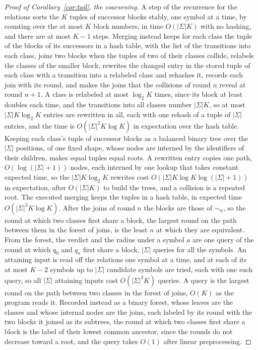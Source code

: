 \documentclass[11pt,a4paper]{article}
\theoremstyle{definition}
\theoremstyle{plain}
\begin{document}
\begin{proof}[Proof of Corollary~\ref{cor:tail}, the coarsening]
A step of the recurrence for the relations sorts the \(K\) tuples of successor blocks stably, one symbol at a time, by
counting over the at most \(K\) block numbers, in time \(O(|\Sigma| K)\) with no hashing, and there are at most
\(K - 1\) steps. Merging instead keeps for each class the tuple of the blocks of its successors in a hash table, with
the list of the transitions into each class, joins two blocks when the tuples of two of their classes collide, relabels
the classes of the smaller block, rewrites the changed entry in the stored tuple of each class with a transition into a
relabeled class and rehashes it, records each join with its round, and makes the joins that the collisions of round
\(n\) reveal at round \(n + 1\). A class is relabeled at most \(\log_2 K\) times, since its block at least doubles each
time, and the transitions into all classes number \(|\Sigma| K\), so at most \(|\Sigma| K \log_2 K\) entries are
rewritten in all, each with one rehash of a tuple of \(|\Sigma|\) entries, and the time is \(O(|\Sigma|^2 K \log K)\) in
expectation over the hash table. Keeping each class's tuple of successor blocks as a balanced binary tree over the
\(|\Sigma|\) positions, of one fixed shape, whose nodes are interned by the identifiers of their children, makes equal
tuples equal roots. A rewritten entry copies one path, \(O(\log(|\Sigma| + 1))\) nodes, each interned by one lookup that
takes constant expected time, so the \(|\Sigma| K \log_2 K\) rewrites cost \(O(|\Sigma| K \log K \log(|\Sigma| + 1))\)
in expectation, after \(O(|\Sigma| K)\) to build the trees, and a collision is a repeated root. The executed merging
keeps the tuples in a hash table, in expected time \(O(|\Sigma|^2 K \log K)\). After the joins of round \(n\) the blocks
are those of \(\sim_n\), so the round at which two classes first share a block, the largest round on the path between
them in the forest of joins, is the least \(n\) at which they are equivalent. From the forest, the verdict and the
radius under a symbol \(a\) are one query of the round at which \(q_0\) and \(q_a\) first share a block, \(|\Sigma|\)
queries for all the symbols. An attaining input is read off the relations one symbol at a time, and at each of its at
most \(K - 2\) symbols up to \(|\Sigma|\) candidate symbols are tried, each with one such query, so all \(|\Sigma|\)
attaining inputs cost \(O(|\Sigma|^2 K)\) queries. A query is the largest round on the path between two classes in the
forest of joins, \(O(K)\) as the program reads it. Recorded instead as a binary forest, whose leaves are the classes and
whose internal nodes are the joins, each labeled by its round with the two blocks it joined as its subtrees, the round
at which two classes first share a block is the label of their lowest common ancestor, since the rounds do not decrease
toward a root, and the query takes \(O(1)\) after linear preprocessing.
\end{proof}
\end{document}
